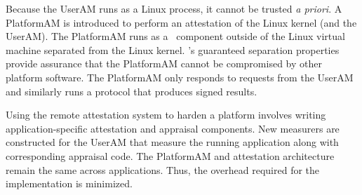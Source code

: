 Because the UserAM runs as a Linux process, it cannot be
trusted \emph{a priori}.  A PlatformAM is introduced to perform an
attestation of the Linux kernel (and the UserAM).  The PlatformAM runs as a
\selFour \ component outside of the Linux virtual machine 
separated from the Linux kernel.  \selFour's guaranteed
separation properties provide assurance that the PlatformAM cannot be
compromised by other platform software.  The PlatformAM only
responds to requests from the UserAM and similarly runs a protocol
that produces signed results.

Using the remote attestation system to harden a platform involves
writing application-specific attestation and appraisal components.
New measurers are constructed for the UserAM that measure the running
application along with corresponding appraisal code.  The PlatformAM
and attestation architecture remain the same across applications.
Thus, the overhead required for the implementation is minimized.